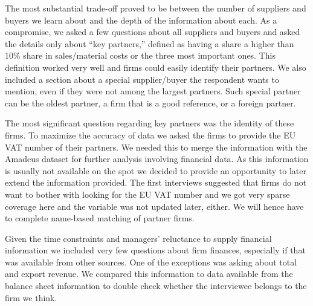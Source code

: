 \documentclass[final, dvipsnames, authoryear,12pt]{elsarticle}
\begin{document}

The most substantial trade-off proved to be between the number of suppliers and buyers we learn about and the depth of the information about each. As a compromise, we asked a few questions about all suppliers and buyers and asked the details only about ``key partners,'' defined as having a share a higher than 10\% share in sales/material costs or the three most important ones. This definition worked very well and firms could easily identify their partners. We also included a section about a special supplier/buyer the respondent wants to mention, even if they were not among the largest partners. Such special partner can be the oldest partner, a firm that is a good reference, or a foreign partner.

The most significant question regarding key partners was the identity of these firms. To maximize the accuracy of data we asked the firms to provide the EU VAT number of their partners. We needed this to merge the information with the Amadeus dataset for further analysis involving financial data. As this information is usually not available on the spot we decided to provide an opportunity to later extend the information provided. The first interviews suggested that firms do not want to bother with looking for the EU VAT number and we got very sparse coverage here and the variable was not updated later, either. We will hence have to complete name-based matching of partner firms.

Given the time constraints and managers' reluctance to supply financial information \citep{Bloom2014-hc} we included very few questions about firm finances, especially if that was available from other sources. One of the exceptions was asking about total and export revenue. We compared this information to data available from the balance sheet information to double check whether the interviewee belongs to the firm we think. 

\end{document}
